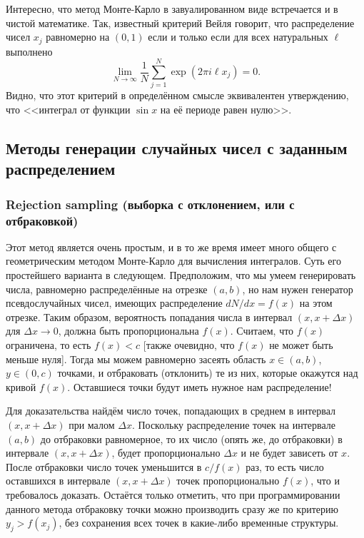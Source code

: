 \documentclass{book}
\begin{document}
Интересно, что метод Монте-Карло в завуалированном виде встречается и в чистой математике. Так,
известный критерий Вейля говорит, что распределение чисел $x_j$ равномерно на $(0, 1)$ если и
только если для всех натуральных $\ell$ выполнено
\begin{equation}
    \lim_{N \to \infty} \frac{1}{N} \sum_{j = 1}^N \exp(2 \pi i \ell x_j) = 0.
\end{equation}
Видно, что этот критерий в определённом смысле эквивалентен утверждению, что <<интеграл от функции
$\sin x$ на её периоде равен нулю>>.

\subsection{Методы генерации случайных чисел с заданным распределением}

\subsubsection{Rejection sampling (выборка с отклонением, или с отбраковкой)}

Этот метод является очень простым, и в то же время имеет много общего с геометрическим методом
Монте-Карло для вычисления интегралов. Суть его простейшего варианта в следующем. Предположим, что
мы умеем генерировать числа, равномерно распределённые на отрезке $(a, b)$, но нам нужен генератор
псевдослучайных чисел, имеющих распределение $dN/dx = f(x)$ на этом отрезке. Таким образом,
вероятность попадания числа в интервал $(x, x + \Delta x)$ для $\Delta x \to 0$, должна быть
пропорциональна $f(x)$.  Считаем, что $f(x)$ ограничена, то есть $f(x) < c$ [также очевидно, что
$f(x)$ не может быть меньше нуля]. Тогда мы можем равномерно засеять область $x \in (a, b)$, $y \in
(0, c)$ точками, и отбраковать (отклонить) те из них, которые окажутся над кривой $f(x)$.
Оставшиеся точки будут иметь нужное нам распределение!

Для доказательства найдём число точек, попадающих в среднем в интервал $(x, x + \Delta x)$ при
малом $\Delta x$. Поскольку распределение точек на интервале $(a, b)$ до отбраковки равномерное, то
их число (опять же, до отбраковки) в интервале $(x, x + \Delta x)$, будет пропорционально $\Delta
x$ и не будет зависеть от $x$. После отбраковки число точек уменьшится в $c / f(x)$ раз, то есть
число оставшихся в интервале $(x, x + \Delta x)$ точек пропорционально $f(x)$, что и требовалось
доказать. Остаётся только отметить, что при программировании данного метода отбраковку точки можно
производить сразу же по критерию $y_j > f(x_j)$, без сохранения всех точек в какие-либо временные
структуры.
\end{document}
